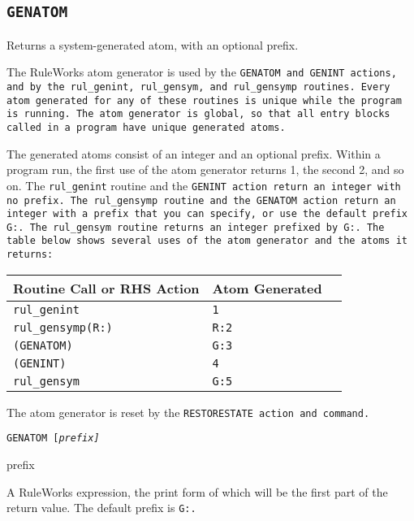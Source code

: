 \subsection{\tt{GENATOM}}

Returns a system-generated atom, with an optional prefix.

The RuleWorks atom generator is used by the \tt{GENATOM} and
\tt{GENINT} actions, and by the \verb|rul_genint|, \verb|rul_gensym|,
and \verb|rul_gensymp| routines. Every atom generated for any of these
routines is unique while the program is running. The atom generator is
global, so that all entry blocks called in a program have unique
generated atoms.

The generated atoms consist of an integer and an optional
prefix. Within a program run, the first use of the atom generator
returns 1, the second 2, and so on. The \verb|rul_genint| routine and
the \tt{GENINT} action return an integer with no prefix. The
\verb|rul_gensymp| routine and the \tt{GENATOM} action return an
integer with a prefix that you can specify, or use the default prefix
\tt{G:}. The \verb|rul_gensym| routine returns an integer prefixed by
\tt{G:}. The table below shows several uses of the atom generator and
the atoms it returns:

\begin{center}
  \begin{tabular}{lll}
    \toprule
    Routine Call or RHS Action & Atom Generated \\
    \midrule
    \verb|rul_genint| &  \verb|1| \\
    \verb|rul_gensymp(R:)| & \verb|R:2| \\
    \verb|(GENATOM)| & \verb|G:3| \\
    \verb|(GENINT)| & \verb|4| \\
    \verb|rul_gensym| & \verb|G:5| \\
    \bottomrule
  \end{tabular}
\end{center}

The atom generator is reset by the \tt{RESTORESTATE} action and
command.

\Format

\tt{GENATOM} [\it{prefix}]

\begin{arguments}
\item[prefix]

  A RuleWorks expression, the print form of which will be the first
  part of the return value. The default prefix is \tt{G:}.
\end{arguments}

